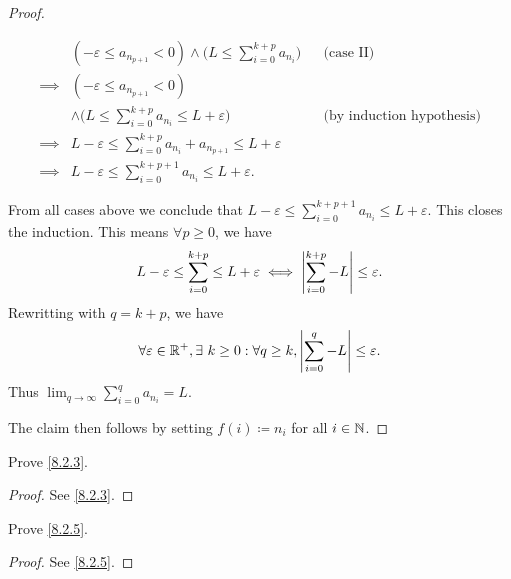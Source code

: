 \begin{proof}
\begin{itemize}
\begin{itemize}
                  \begin{align*}
                             & (-\varepsilon \leq a_{n_{p + 1}} < 0) \land \Bigg(L \leq \sum_{i = 0}^{k + p} a_{n_i}\Bigg) &  & \text{(case II)}                 \\
                    \implies & (-\varepsilon \leq a_{n_{p + 1}} < 0)                                                                                             \\
                             & \land \Bigg(L \leq \sum_{i = 0}^{k + p} a_{n_i} \leq L + \varepsilon\Bigg)                  &  & \text{(by induction hypothesis)} \\
                    \implies & L - \varepsilon \leq \sum_{i = 0}^{k + p} a_{n_i} + a_{n_{p + 1}} \leq L + \varepsilon                                            \\
                    \implies & L - \varepsilon \leq \sum_{i = 0}^{k + p + 1} a_{n_i} \leq L + \varepsilon.
                  \end{align*}
          \end{itemize}
          From all cases above we conclude that \(L - \varepsilon \leq \sum_{i = 0}^{k + p + 1} a_{n_i} \leq L + \varepsilon\).
          This closes the induction.
          This means \(\forall p \geq 0\), we have
          \[
            L - \varepsilon \leq \sum_{i = 0}^{k + p} \leq L + \varepsilon \iff \left\lvert\sum_{i = 0}^{k + p} - L\right\rvert \leq \varepsilon.
          \]
          Rewritting with \(q = k + p\), we have
          \[
            \forall \varepsilon \in \mathbb{R}^+, \exists\ k \geq 0 : \forall q \geq k, \left\lvert\sum_{i = 0}^q - L\right\rvert \leq \varepsilon.
          \]
          Thus \(\lim_{q \to \infty} \sum_{i = 0}^q a_{n_i} = L\).
  \end{itemize}
  The claim then follows by setting \(f(i) \coloneqq n_i\) for all \(i \in \mathbb{N}\).
\end{proof}

\exercisesection

\begin{ex}\label{ex:8.2.1}
  Prove \cref{8.2.3}.
\end{ex}

\begin{proof}
  See \cref{8.2.3}.
\end{proof}

\begin{ex}\label{ex:8.2.2}
  Prove \cref{8.2.5}.
\end{ex}

\begin{proof}
  See \cref{8.2.5}.
\end{proof}

